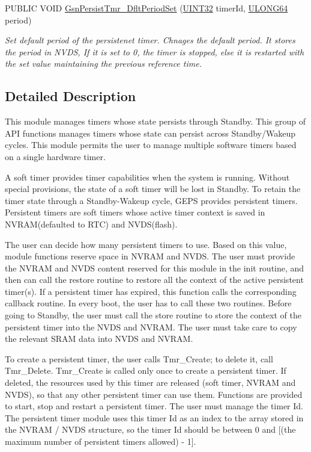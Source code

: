 \begin{DoxyCompactItemize}
PUBLIC VOID \hyperlink{a00671_ga72f5225fa0da29f815d14a417c29611e}{GsnPersistTmr\_\-DfltPeriodSet} (\hyperlink{a00660_gae1e6edbbc26d6fbc71a90190d0266018}{UINT32} timerId, \hyperlink{a00660_ga28961430434ccabca6862ea93fe9a15b}{ULONG64} period)
\begin{DoxyCompactList}\small\item\em Set default period of the persistenet timer. Chnages the default period. It stores the period in NVDS, If it is set to 0, the timer is stopped, else it is restarted with the set value maintaining the previous reference time. \end{DoxyCompactList}\end{DoxyCompactItemize}


\subsection{Detailed Description}
This module manages timers whose state persists through Standby. This group of API functions manages timers whose state can persist across Standby/Wakeup cycles. This module permits the user to manage multiple software timers based on a single hardware timer.

A soft timer provides timer capabilities when the system is running. Without special provisions, the state of a soft timer will be lost in Standby. To retain the timer state through a Standby-\/Wakeup cycle, GEPS provides persistent timers. Persistent timers are soft timers whose active timer context is saved in NVRAM(defaulted to RTC) and NVDS(flash).

The user can decide how many persistent timers to use. Based on this value, module functions reserve space in NVRAM and NVDS. The user must provide the NVRAM and NVDS content reserved for this module in the init routine, and then can call the restore routine to restore all the context of the active persistent timer(s). If a persistent timer has expired, this function calls the corresponding callback routine. In every boot, the user has to call these two routines. Before going to Standby, the user must call the store routine to store the context of the persistent timer into the NVDS and NVRAM. The user must take care to copy the relevant SRAM data into NVDS and NVRAM.

To create a persistent timer, the user calls Tmr\_\-Create; to delete it, call Tmr\_\-Delete. Tmr\_\-Create is called only once to create a persistent timer. If deleted, the resources used by this timer are released (soft timer, NVRAM and NVDS), so that any other persistent timer can use them. Functions are provided to start, stop and restart a persistent timer. The user must manage the timer Id. The persistent timer module uses this timer Id as an index to the array stored in the NVRAM / NVDS structure, so the timer Id should be between 0 and \mbox{[}(the maximum number of persistent timers allowed) -\/ 1\mbox{]}. 


